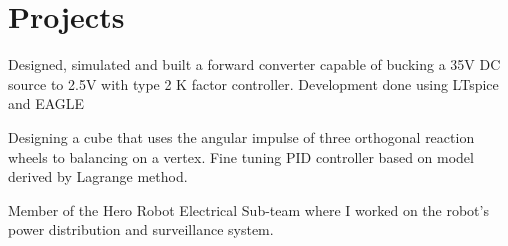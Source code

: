 \documentclass[]{hieudo-build}
\begin{document}
\begin{minipage}[t]{0.62\textwidth}
\section{Projects}
\descript{}
Designed, simulated and built a forward converter capable of
bucking a 35V DC source to 2.5V with type 2 K factor controller. Development done using LTspice and EAGLE 
\sectionsep

Designing a cube that uses the angular impulse of three orthogonal reaction wheels to balancing on a vertex. Fine tuning PID controller based on model derived by Lagrange method. 
\sectionsep

\descript{}
Member of the Hero Robot Electrical Sub-team where I worked on the robot's power distribution and surveillance system.  
\sectionsep 


\end{minipage} 
\end{document}
